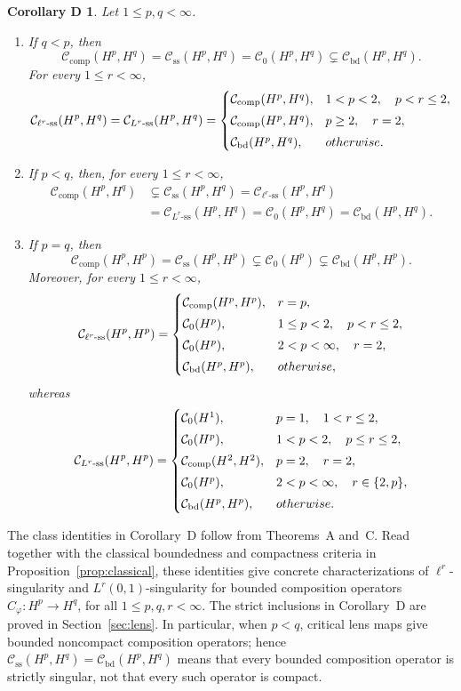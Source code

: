 \documentclass[10pt,a4paper]{amsart}
\newtheorem*{corollaryD}{Corollary D}
\newcommand{\CB}{\mathcal C_{\mathrm{bd}}}
\newcommand{\CK}{\mathcal C_{\mathrm{comp}}}
\newcommand{\CS}{\mathcal C_{\mathrm{ss}}}
\newcommand{\CSell}[1]{\mathcal C_{\ell^{#1}\text{-ss}}}
\newcommand{\CSL}[1]{\mathcal C_{L^{#1}\text{-ss}}}
\begin{document}
\begin{corollaryD}
Let \(1\le p,q<\infty\). 

\begin{enumerate}[label=\textup{(\roman*)}]
\item If \(q<p\), then
\[
\CK(H^p,H^q)
=
\CS(H^p,H^q)
=
\mathcal C_0(H^p,H^q)
\subsetneq
\CB(H^p,H^q).
\]
For every \(1\le r<\infty\),
\[
\CSell{r}(H^p,H^q)
=
\CSL{r}(H^p,H^q)
=
\begin{cases}
\CK(H^p,H^q),
& 1<p<2,\quad p<r\le2,\\[1mm]
\CK(H^p,H^q),
& p\ge2,\quad r=2,\\[1mm]
\CB(H^p,H^q),
& \textup{otherwise}.
\end{cases}
\]

\item If \(p<q\), then, for every \(1\le r<\infty\),
\[
\begin{aligned}
\CK(H^p,H^q)
&\subsetneq
\CS(H^p,H^q)
=
\CSell{r}(H^p,H^q)\\
&=
\CSL{r}(H^p,H^q)
=
\mathcal C_0(H^p,H^q)
=
\CB(H^p,H^q).
\end{aligned}
\]

\item If \(p=q\), then
\[
\CK(H^p,H^p)
=
\CS(H^p,H^p)
\subsetneq
\mathcal C_0(H^p)
\subsetneq
\CB(H^p,H^p).
\]
Moreover, for every \(1\le r<\infty\),
\[
\CSell{r}(H^p,H^p)
=
\begin{cases}
\CK(H^p,H^p),
& r=p,\\[1mm]
\mathcal C_0(H^p),
& 1\le p<2,\quad p<r\le2,\\[1mm]
\mathcal C_0(H^p),
& 2<p<\infty,\quad r=2,\\[1mm]
\CB(H^p,H^p),
& \textup{otherwise},
\end{cases}
\]
whereas
\[
\CSL{r}(H^p,H^p)
=
\begin{cases}
\mathcal C_0(H^1),
& p=1,\quad 1<r\le2,\\[1mm]
\mathcal C_0(H^p),
& 1<p<2,\quad p\le r\le2,\\[1mm]
\CK(H^2,H^2),
& p=2,\quad r=2,\\[1mm]
\mathcal C_0(H^p),
& 2<p<\infty,\quad r\in\{2,p\},\\[1mm]
\CB(H^p,H^p),
& \textup{otherwise}.
\end{cases}
\]
\end{enumerate}
\end{corollaryD}

The class identities in Corollary~D follow from Theorems~A and~C.
Read together with the classical boundedness and compactness criteria
in Proposition~\ref{prop:classical}, these identities give concrete
characterizations of \(\ell^r\)-singularity and
\(L^r(0,1)\)-singularity for bounded composition operators
\(C_\varphi:H^p\to H^q\), for all \(1\le p,q,r<\infty\).
The strict inclusions in Corollary~D are proved in
Section~\ref{sec:lens}. In particular, when \(p<q\), critical lens
maps give bounded noncompact composition operators; hence
\(\CS(H^p,H^q)=\CB(H^p,H^q)\) means that every bounded composition
operator is strictly singular, not that every such operator is compact.
\end{document}

